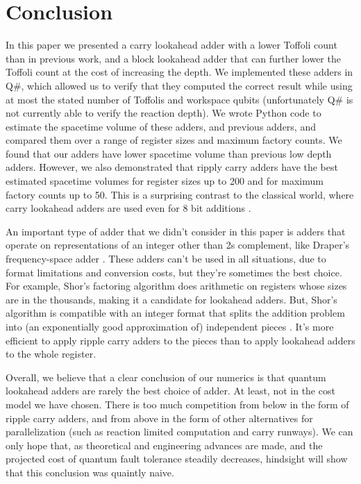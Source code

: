 \documentclass[onecolumn,unpublished]{quantumarticle}
\theoremstyle{definition}
\theoremstyle{definition}
\theoremstyle{definition}
\begin{document}
\section{Conclusion}
\label{sec:conclusion}

In this paper we presented a carry lookahead adder with a lower Toffoli count than in previous work, and a block lookahead adder that can further lower the Toffoli count at the cost of increasing the depth.
We implemented these adders in Q\#, which allowed us to verify that they computed the correct result while using at most the stated number of Toffolis and workspace qubits (unfortunately Q\# is not currently able to verify the reaction depth).
We wrote Python code to estimate the spacetime volume of these adders, and previous adders, and compared them over a range of register sizes and maximum factory counts.
We found that our adders have lower spacetime volume than previous low depth adders.
However, we also demonstrated that ripply carry adders have the best estimated spacetime volumes for register sizes up to 200 and for maximum factory counts up to 50.
This is a surprising contrast to the classical world, where carry lookahead adders are used even for 8 bit additions \cite{shirriff2020reverseengineer8008}.

An important type of adder that we didn't consider in this paper is adders that operate on representations of an integer other than 2s complement, like Draper's frequency-space adder \cite{draper2000qftaddition}.
These adders can't be used in all situations, due to format limitations and conversion costs, but they're sometimes the best choice.
For example, Shor's factoring algorithm \cite{shor1994algorithms} does arithmetic on registers whose sizes are in the thousands, making it a candidate for lookahead adders.
But, Shor's algorithm is compatible with an integer format that splits the addition problem into (an exponentially good approximation of) independent pieces \cite{gidney2019approximate,gidney2019factor}.
It's more efficient to apply ripple carry adders to the pieces than to apply lookahead adders to the whole register.

Overall, we believe that a clear conclusion of our numerics is that quantum lookahead adders are rarely the best choice of adder.
At least, not in the cost model we have chosen.
There is too much competition from below in the form of ripple carry adders, and from above in the form of other alternatives for parallelization (such as reaction limited computation and carry runways).
We can only hope that, as theoretical and engineering advances are made, and the projected cost of quantum fault tolerance steadily decreases, hindsight will show that this conclusion was quaintly naive.





\end{document}
